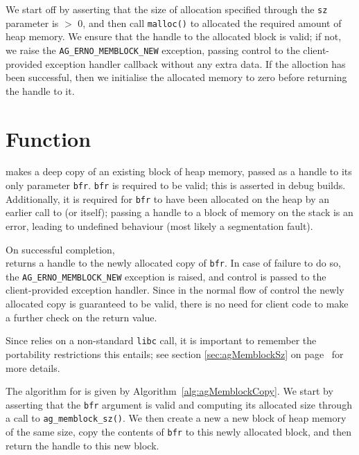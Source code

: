 We start off by asserting that the size of allocation specified through the
\verb|sz| parameter is $>$ 0, and then call \verb|malloc()| to allocated the
required amount of heap memory. We ensure that the handle to the allocated block
is valid; if not, we raise the \verb|AG_ERNO_MEMBLOCK_NEW| exception, passing
control to the client-provided exception handler callback without any extra
data. If the alloction has been successful, then we initialise the allocated
memory to zero before returning the handle to it.


%
%
\section{Function \agMemblockCopy}

\agMemblockCopy{} makes a deep copy of an existing block of heap memory, passed as
a handle to its only parameter \verb|bfr|. \verb|bfr| is required to be valid;
this is asserted in debug builds. Additionally, it is required for \verb|bfr| to
have been allocated on the heap by an earlier call to \agMemblockNew{}  (or 
\agMemblockCopy{} itself); passing a handle to a block of memory on the stack is
an error, leading to undefined behaviour (most likely a segmentation fault).


On successful completion, \agMemblockCopy{} \\ returns a handle to the newly 
allocated copy of \verb|bfr|. In case of failure to do so, the 
\verb|AG_ERNO_MEMBLOCK_NEW| exception is raised, and control is passed to the 
client-provided exception handler. Since in the normal flow of control the newly
allocated copy is guaranteed to be valid, there is no need for client code to 
make a further check on the return value.

Since \agMemblockCopy{} relies on a non-standard \verb|libc| call, it is 
important to remember the portability restrictions this entails; see section
\ref{sec:agMemblockSz} on page\ \pageref{sec:agMemblockSz} for more details.

The algorithm for \agMemblockCopy{} is given by Algorithm\ 
\ref{alg:agMemblockCopy}. We start by asserting that the \verb|bfr| argument is
valid and computing its allocated size through a call to
\verb|ag_memblock_sz()|. We then create a new a new block of heap memory of the
same size, copy the contents of \verb|bfr| to this newly allocated block, and
then return the handle to this new block.


